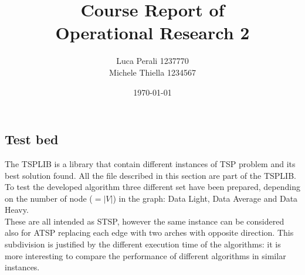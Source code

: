 \documentclass[10pt, english, openany]{report}
\title{Course Report of \\ Operational Research 2}
\author{Luca Perali 1237770 \\ Michele Thiella 1234567}
\date{\today}
\begin{document}

	
	

	\tableofcontents{}
	\clearpage

	
	
	
	
	
	
	
	
	
	\clearpage
	
	\begin{appendices}
		
		\chapter{Test bed} \label{sec:testset}
		The TSPLIB \cite{TSPLIB} is a library that contain different instances of TSP problem and its best solution found. All the file described in this section are part of the TSPLIB. To test the developed algorithm three different set have been prepared, depending on the number of node ($=|V|$) in the graph: Data Light, Data Average and Data Heavy.\\
		These are all intended as STSP, however the same instance can be considered also for ATSP replacing each edge with two arches with opposite direction. This subdivision is justified by the different execution time of the algorithms: it is more interesting to compare the performance of different algorithms in similar instances.\\
		

\end{appendices}
\end{document}
